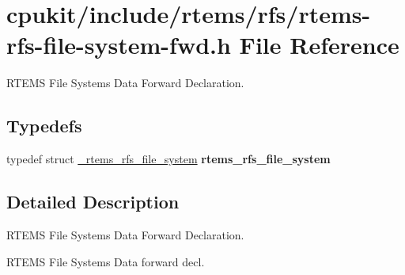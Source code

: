 \hypertarget{rtems-rfs-file-system-fwd_8h}{}\section{cpukit/include/rtems/rfs/rtems-\/rfs-\/file-\/system-\/fwd.h File Reference}
\label{rtems-rfs-file-system-fwd_8h}


R\+T\+E\+MS File Systems Data Forward Declaration.  


\subsection*{Typedefs}
\begin{DoxyCompactItemize}
\item 
\mbox{\label{rtems-rfs-file-system-fwd_8h_ac989f1fa5fb71dac7eb747f3d64642b4}} 
typedef struct \mbox{\hyperlink{struct__rtems__rfs__file__system}{\+\_\+rtems\+\_\+rfs\+\_\+file\+\_\+system}} {\bfseries rtems\+\_\+rfs\+\_\+file\+\_\+system}
\end{DoxyCompactItemize}


\subsection{Detailed Description}
R\+T\+E\+MS File Systems Data Forward Declaration. 

R\+T\+E\+MS File Systems Data forward decl. 